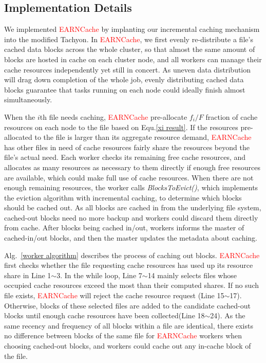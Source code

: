 \subsection{Implementation Details}\label{sec:share and fair}

We implemented \textcolor{red}{EARNCache} by implanting our incremental caching mechanism into the modified Tachyon\textcolor{red}{\cite{tachyon}}. In \textcolor{red}{EARNCache}, we first evenly re-distribute a file's cached data blocks across the whole cluster, so that almost the same amount of blocks are hosted in cache on each cluster node, and all workers can manage their cache resources independently yet still in concert. As uneven data distribution will drag down completion of the whole job, evenly distributing cached data blocks guarantee that tasks running on each node could ideally finish almost simultaneously.

When the $i$th file needs caching, \textcolor{red}{EARNCache} pre-allocate ${f_i}/{F}$ fraction of cache resources on each node to the file based on Equ.\ref{xi result}. If the resources pre-allocated to the file is larger than its aggregate resource demand, \textcolor{red}{EARNCache} has other files in need of cache resources fairly share the resources beyond the file's actual need. Each worker checks its remaining free cache resources, and allocates as many resources as necessary to them directly if enough free resources are available, which could make full use of cache resources. When there are not enough remaining resources, the worker calls \emph{BlocksToEvict()}, which implements the eviction algorithm with incremental caching, to determine which blocks should be cached out. As all blocks are cached in from the underlying file system, cached-out blocks need no more backup and workers could discard them directly from cache. After blocks being cached in/out, workers informs the master of cached-in/out blocks, and then the master updates the metadata about caching.

Alg.~\ref{worker algorithm} describes the process of caching out blocks. \textcolor{red}{EARNCache} first checks whether the file requesting cache resources has used up its resource share in Line 1$\sim$3. In the while loop, Line 7$\sim$14 mainly selects files whose occupied cache resources exceed the most than their computed shares. If no such file exists, \textcolor{red}{EARNCache} will reject the cache resource request (Line 15$\sim$17). Otherwise, blocks of these selected files are added to the candidate cached-out blocks until enough cache resources have been collected(Line 18$\sim$24). As the same recency and frequency of all blocks within a file are identical, there exists no difference between blocks of the same file for \textcolor{red}{EARNCache} workers when choosing cached-out blocks, and workers could cache out any in-cache block of the file.

